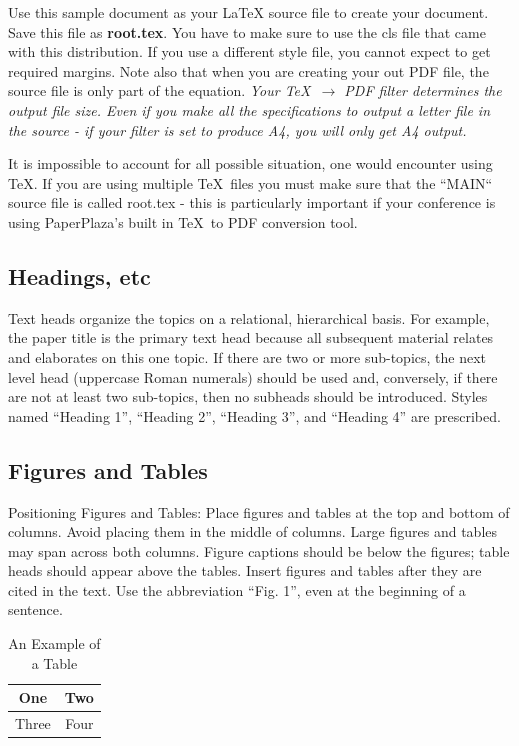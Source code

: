 \documentclass[letterpaper, 10 pt, conference]{ieeeconf}  %
\begin{document}
Use this sample document as your LaTeX source file to create your document. Save this file as {\bf root.tex}. You have to make sure to use the cls file that came with this distribution. If you use a different style file, you cannot expect to get required margins. Note also that when you are creating your out PDF file, the source file is only part of the equation. {\it Your \TeX\ $\rightarrow$ PDF filter determines the output file size. Even if you make all the specifications to output a letter file in the source - if your filter is set to produce A4, you will only get A4 output. }

It is impossible to account for all possible situation, one would encounter using \TeX. If you are using multiple \TeX\ files you must make sure that the ``MAIN`` source file is called root.tex - this is particularly important if your conference is using PaperPlaza's built in \TeX\ to PDF conversion tool.

\subsection{Headings, etc}

Text heads organize the topics on a relational, hierarchical basis. For example, the paper title is the primary text head because all subsequent material relates and elaborates on this one topic. If there are two or more sub-topics, the next level head (uppercase Roman numerals) should be used and, conversely, if there are not at least two sub-topics, then no subheads should be introduced. Styles named ``Heading 1'', ``Heading 2'', ``Heading 3'', and ``Heading 4'' are prescribed.

\subsection{Figures and Tables}

Positioning Figures and Tables: Place figures and tables at the top and bottom of columns. Avoid placing them in the middle of columns. Large figures and tables may span across both columns. Figure captions should be below the figures; table heads should appear above the tables. Insert figures and tables after they are cited in the text. Use the abbreviation ``Fig. 1'', even at the beginning of a sentence.

\begin{table}[h]
\caption{An Example of a Table}
\label{table_example}
\begin{center}
\begin{tabular}{|c||c|}
\hline
One & Two\\
\hline
Three & Four\\
\hline
\end{tabular}
\end{center}
\end{table}
\end{document}

